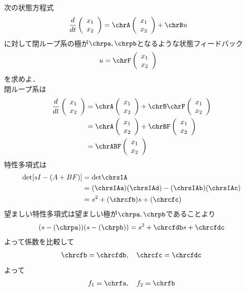 次の状態方程式
\begin{align*}
	\frac{d}{dt}
	\vx
	& = 
	\chrA \vx
	+
	\chrB
	u
\end{align*}
に対して閉ループ系の極が$ \chrpa, \chrpb $となるような状態フィードバック
\begin{align*}
	u 
	&=
	\chrF \vx
\end{align*}
を求めよ．
\\

閉ループ系は
\begin{align*}
	\frac{d}{dt} \vx
	&= \chrA \vx + \chrB \chrF \vx
\\
	&= \chrA \vx + \chrBF \vx
\\
	&= \chrABF \vx
\end{align*}
特性多項式は
\begin{align*}
	\mbox{det}[sI-(A+BF)]
	& =
	\mbox{det} \chrsIA
\\
	&= (\chrsIAa)(\chrsIAd)-(\chrsIAb)(\chrsIAc)
\\
	&=  s^2 + (\chrcfb) s + (\chrcfc)
\end{align*}
望ましい特性多項式は望ましい極が$\chrpa,\chrpb$であることより
\begin{align*}
	(s-(\chrpa))(s-(\chrpb)) = s^2 + \chrcfdb s + \chrcfdc 
\end{align*}
よって係数を比較して
\begin{align*}
	\chrcfb=\chrcfdb, \ \ \ \chrcfc =\chrcfdc
\end{align*}
よって
\begin{align*}
	f_1=\chrfa, \ \ \ f_2=\chrfb
\end{align*}




